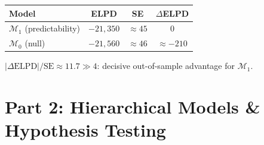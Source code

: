 \documentclass[12pt,a4paper]{article}
\begin{document}
\begin{tcolorbox}[resultbox, title={Cross-Validation Results}]
\begin{center}
\renewcommand{\arraystretch}{1.4}
\begin{tabular}{lccc}
  \toprule
  \textbf{Model} & \textbf{ELPD} & \textbf{SE} & \textbf{$\Delta$ELPD} \\
  \midrule
  $\mathcal{M}_1$ (predictability) & $-21{,}350$ & $\approx45$ & $0$ \\
  $\mathcal{M}_0$ (null)           & $-21{,}560$ & $\approx46$ & $\approx-210$ \\
  \bottomrule
\end{tabular}
\end{center}
\vspace{4pt}
\small $|\Delta\mathrm{ELPD}|/\mathrm{SE}\approx11.7\gg4$: decisive out-of-sample advantage for $\mathcal{M}_1$.
\end{tcolorbox}

\newpage
\section{Part 2: Hierarchical Models \& Hypothesis Testing}
\end{document}
